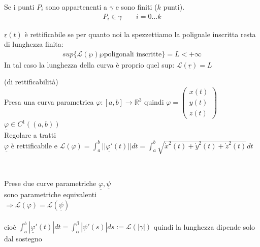 \documentclass[a4paper, oneside]{article}
\newcommand{\tab}{\hspace*{2em}}
\begin{document}
\begin{observation}
    Se i punti $P_i$ sono appartenenti a $\gamma$ e sono finiti ($k$ punti).
    \begin{gather*}
        P_i \in \gamma \qquad i = 0...k
    \end{gather*}
\end{observation}


\begin{definition}[rettificabilità]
    $\underline{r}(t)$ è rettificabile se per quanto noi la spezzettiamo la polignale inscritta resta di lunghezza finita:
    \begin{gather*}
        sup\{\mathcal{L}(\wp) \wp \text{poligonali inscritte}\} = L < +\infty
    \end{gather*}
    In tal caso la lunghezza della curva è proprio quel sup: $\mathcal{L}(\underline{r}) = L$
\end{definition}


\begin{theorem}
    (di rettificabilità) \\
    Presa una curva parametrica $\varphi: [a,b] \to \mathbb{R}^3$ quindi $\underline{\varphi} = \begin{pmatrix}
        x(t)\\ y(t)\\ z(t)
    \end{pmatrix}$\\
     $\underline{\varphi} \in C^1((a,b))$\\
     Regolare a tratti\\
    \tab {} $ \underline{\varphi}$ è rettificabile e $\mathcal{L}(\varphi) = \int_{a}^{b} ||\underline{\varphi' }(t)|| dt = \int_{a}^{b} \sqrt{\dot{x}^2(t)+\dot{y}^2(t)+\dot{z}^2(t)} dt$
\end{theorem}
\hfill\\


\begin{proposition}
    Prese due curve parametriche $\underline{\varphi}, \underline{\psi}$\\ 
     sono parametriche equivalenti \\
    \tab$\Rightarrow \mathcal{L}(\varphi) = \mathcal{L}(\underline{\psi})$\\\\
    cioè $ \int_{a}^{b} | \underline{\varphi}'(t) | dt = \int_{\alpha}^{\beta} | \underline{\psi}' (s) | ds := \mathcal{L}(| \gamma |)$ quindi la lunghezza dipende solo dal sostegno
\end{proposition}
\hfill\\
\end{document}
